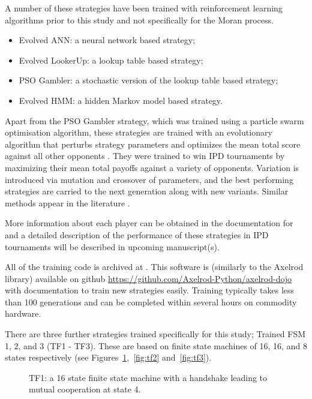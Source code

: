 \documentclass{article}
\begin{document}
A number of these strategies have been trained with reinforcement learning
algorithms prior to this study and not specifically for the Moran process.

\begin{itemize}
    \item Evolved ANN: a neural network based strategy;
    \item Evolved LookerUp: a lookup table based strategy;
    \item PSO Gambler: a stochastic version of the lookup table based strategy;
    \item Evolved HMM: a hidden Markov model based strategy.
\end{itemize}

Apart from the PSO Gambler strategy, which was trained using a particle swarm
optimisation algorithm, these strategies are trained with an evolutionary
algorithm that perturbs strategy parameters and optimizes the mean total score
against all other opponents \cite{affenzeller2009genetic}. They were trained to
win IPD tournaments by maximizing their mean total payoffs against a variety
of opponents. Variation is
introduced via mutation and crossover of parameters, and the best performing
strategies are carried to the next generation along with new variants. Similar
methods appear in the literature \cite{Ashlock2006}.

More information about each player can be obtained in the documentation for
\cite{axelrodproject} and a detailed description of the performance
 of these strategies in IPD tournaments will be described in upcoming manuscript(s).

All of the training code is archived at \cite{marc_harper_2017_824264}. This
software is (similarly to the Axelrod library) available on github
\url{https://github.com/Axelrod-Python/axelrod-dojo} with documentation to
train new strategies easily. Training
typically takes less than 100 generations and can be completed within several
hours on commodity hardware.

There are three further strategies trained specifically for this study; Trained
FSM 1, 2, and 3 (TF1 - TF3). These are based on finite state machines of 16, 16,
and 8 states respectively (see Figures~\ref{fig:tf1},~\ref{fig:tf2}
and~\ref{fig:tf3}).


\begin{figure}[!hbtp]
    \centering
    
    \caption{TF1: a 16 state finite state machine with a handshake leading to
    mutual cooperation at state 4.}
    \label{fig:tf1}
\end{figure}
\end{document}
